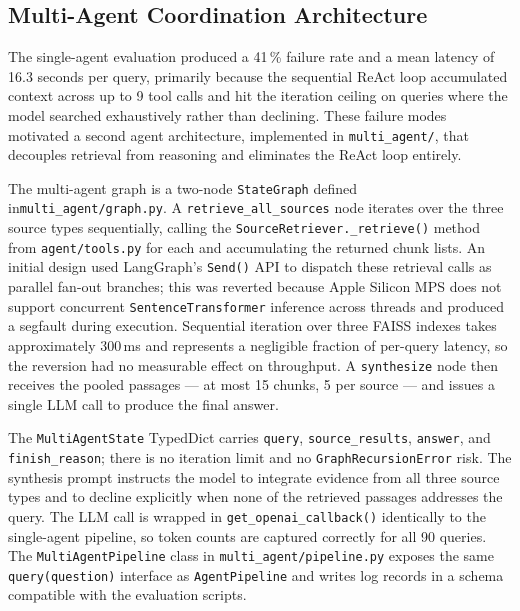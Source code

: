 \subsection{Multi-Agent Coordination Architecture}

The single-agent evaluation produced a 41\,\% failure rate and a mean latency of 16.3 seconds per query, primarily because the sequential ReAct loop accumulated context across up to 9 tool calls and hit the iteration ceiling on queries where the model searched exhaustively rather than declining. These failure modes motivated a second agent architecture, implemented in \texttt{multi\_agent/}, that decouples retrieval from reasoning and eliminates the ReAct loop entirely.

The multi-agent graph is a two-node \texttt{StateGraph} defined in\linebreak[0] \texttt{multi\_agent/graph.py}. A \texttt{retrieve\_all\_sources} node iterates over the three source types sequentially, calling the \texttt{SourceRetriever.\_retrieve()} method from \texttt{agent/tools.py} for each and accumulating the returned chunk lists. An initial design used LangGraph's \texttt{Send()} API to dispatch these retrieval calls as parallel fan-out branches; this was reverted because Apple Silicon MPS does not support concurrent \texttt{SentenceTransformer} inference across threads and produced a segfault during execution. Sequential iteration over three FAISS indexes takes approximately 300\,ms and represents a negligible fraction of per-query latency, so the reversion had no measurable effect on throughput. A \texttt{synthesize} node then receives the pooled passages — at most 15 chunks, 5 per source — and issues a single LLM call to produce the final answer.

The \texttt{MultiAgentState} TypedDict carries \texttt{query}, \texttt{source\_results}, \texttt{answer}, and \texttt{finish\_reason}; there is no iteration limit and no \texttt{GraphRecursionError} risk. The synthesis prompt instructs the model to integrate evidence from all three source types and to decline explicitly when none of the retrieved passages addresses the query. The LLM call is wrapped in \texttt{get\_openai\_callback()} identically to the single-agent pipeline, so token counts are captured correctly for all 90 queries. The \texttt{MultiAgentPipeline} class in \texttt{multi\_agent/pipeline.py} exposes the same \texttt{query(question)} interface as \texttt{AgentPipeline} and writes log records in a schema compatible with the evaluation scripts.

